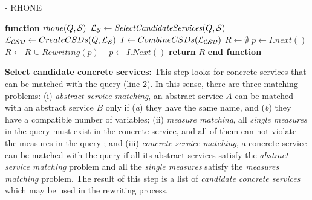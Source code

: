\begin{algorithm}
\small
\caption{ - RHONE}
\label{algo-rhone}
\begin{algorithmic}[1]
\STATE \textbf{function} $\mathit{rhone} (Q, \hbox{${\cal S}$})$
 \STATE  $\hbox{${\cal L_{S}}$} \leftarrow \mathit{SelectCandidateServices}(Q, \hbox{${\cal S}$})$ \label{rhone:buildPCD}
 \STATE  $\hbox{${\cal L_{CSD}}$} \leftarrow CreateCSDs(Q, \hbox{${\cal L_{S}}$})$
 \STATE  $I \leftarrow CombineCSDs(\hbox{${\cal L_{CSD}}$})$
 \STATE $R\leftarrow \emptyset$
    \STATE $p \leftarrow I.next()$
  \STATE $R\leftarrow R\,\cup \mathit{Rewriting}(p)$
  \STATE ~\!
   \ENDIF
      \STATE $p \leftarrow I.\mathit{Next}()$
 \ENDWHILE
    \STATE \textbf{return} $R$
\STATE \textbf{end function}
\end{algorithmic}
\end{algorithm}

\noindent \textbf{Select candidate concrete services:} This step
 looks for concrete services that can be matched with the query (line 2). In
 this sense, there are three matching problems: 
 (i) \textit{abstract service matching}, an abstract service $A$ can be
 matched with an abstract service $B$ only if (\textit{a}) they have the same
 name, and (\textit{b}) they have a compatible number of variables;
 (ii) \textit{measure matching}, all \textit{single measures} in the query must
 exist in the concrete service, and all of them can not violate the measures in
 the query ; and 
 (iii) \textit{concrete service matching}, a concrete service can
 be matched with the query if all its abstract services satisfy the \textit{abstract service
 matching} problem and all the \textit{single measures} satisfy the \textit{measures matching} problem.
The result of this step is a list of \textit{candidate concrete services} which
may be used in the rewriting process.


